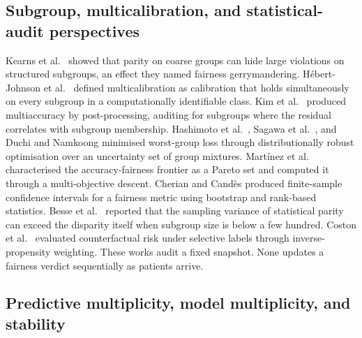 \documentclass[acmsmall,nonacm,review,anonymous]{acmart}
\newcommand{\1}[1]{\mathbf{1}\!\left\{#1\right\}}
\begin{document}
\subsection{Subgroup, multicalibration, and statistical-audit perspectives}

Kearns et al.\ \cite{kearns2018} showed that parity on coarse groups can hide large violations on structured subgroups, an effect they named fairness gerrymandering. H{\'e}bert-Johnson et al.\ \cite{hebertjohnson2018} defined multicalibration as calibration that holds simultaneously on every subgroup in a computationally identifiable class. Kim et al.\ \cite{kim2020} produced multiaccuracy by post-processing, auditing for subgroups where the residual correlates with subgroup membership. Hashimoto et al.\ \cite{hashimoto2018}, Sagawa et al.\ \cite{sagawa2020}, and Duchi and Namkoong \cite{duchi2021} minimised worst-group loss through distributionally robust optimisation over an uncertainty set of group mixtures. Mart{\'i}nez et al.\ \cite{martinez2020} characterised the accuracy-fairness frontier as a Pareto set and computed it through a multi-objective descent. Cherian and Cand{\`e}s \cite{cherian2024} produced finite-sample confidence intervals for a fairness metric using bootstrap and rank-based statistics. Besse et al.\ \cite{besse2022} reported that the sampling variance of statistical parity can exceed the disparity itself when subgroup size is below a few hundred. Coston et al.\ \cite{coston2020} evaluated counterfactual risk under selective labels through inverse-propensity weighting. These works audit a fixed snapshot. None updates a fairness verdict sequentially as patients arrive.

\subsection{Predictive multiplicity, model multiplicity, and stability}
\end{document}
